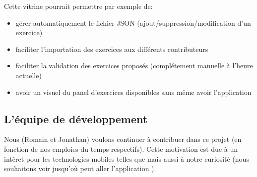 Cette vitrine pourrait permettre par exemple de:
\begin{itemize}
    \item gérer automatiquement le fichier JSON (ajout/suppression/modification d'un exercice)
    \item faciliter l'importation des exercices aux différents contributeurs
    \item faciliter la validation des exercices proposés (complétement manuelle à l'heure actuelle)
    \item avoir un visuel du panel d'exercices disponibles sans même avoir l'application
\end{itemize}


\subsection{L'équipe de développement}
Nous (Romain et Jonathan) voulons continuer à contribuer dans ce projet (en fonction de nos emploies du temps respectifs). Cette motivation est due à un int\^{e}ret pour les technologies mobiles telles que \android{} mais aussi à notre curiosité (nous souhaitons voir jusqu'où peut aller l'application \pepitMobil{}).

